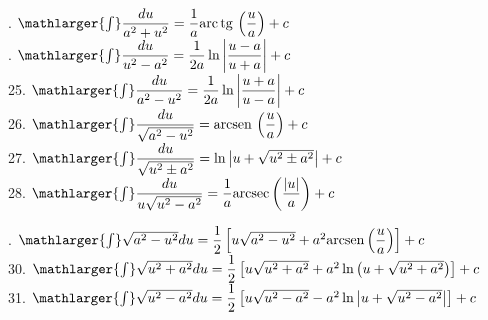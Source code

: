 \cleardoublepage\documentclass[../main.tex]{subfiles}
\begin{document}
\begin{multicols}{2}
. \(\mathlarger{\int} \dfrac{du}{a^2+u^2} =\dfrac{1}{a}{\rm arc\,tg\,} \left(\dfrac{u}{a}\right) +c\)\\
. \(\mathlarger{\int} \dfrac{du}{u^2-a^2} = \dfrac{1}{2a} \ln \left|\dfrac{u-a}{u+a} \right|+c\)\\
25. \(\mathlarger{\int} \dfrac{du}{a^2-u^2} = \dfrac{1}{2a} \ln \left|\dfrac{u+a}{u-a} \right|+c\)\\
26. \(\mathlarger{\int} \dfrac{du}{\sqrt{a^2 -u^2}} ={\rm arcsen}\,\left(\dfrac{u}{a}\right)+c\)\\
27. \(\mathlarger{\int} \dfrac{du}{\sqrt{u^2 \pm a^2}} = \ln \left| u + \sqrt{u^2 \pm a^2} \right| +c\)\\
28. \(\mathlarger{\int} \dfrac{du}{u\sqrt{u^2-a^2}} = \dfrac{1}{a} {\rm arcsec}\left(\dfrac{|u|}{a} \right)+c\)
\end{multicols}
. \(\mathlarger{\int} \sqrt{a^2-u^2}du = \dfrac{1}{2}\left[ u \sqrt{a^2-u^2}+ a^2 {\rm arcsen}\left(\dfrac{u}{a}\right)\right]+c\)\\
30. \(\mathlarger{\int} \sqrt{u^2+a^2}du =\dfrac{1}{2}\left[u\sqrt{u^2+a^2}+a^2\ln\left(u + \sqrt{u^2+a^2}\right) \right] +c\)\\
31. \(\mathlarger{\int} \sqrt{u^2-a^2}du =\dfrac{1}{2}\left[u\sqrt{u^2-a^2}-a^2\ln\left|u + \sqrt{u^2-a^2}\right| \right] +c\)

\end{document}
